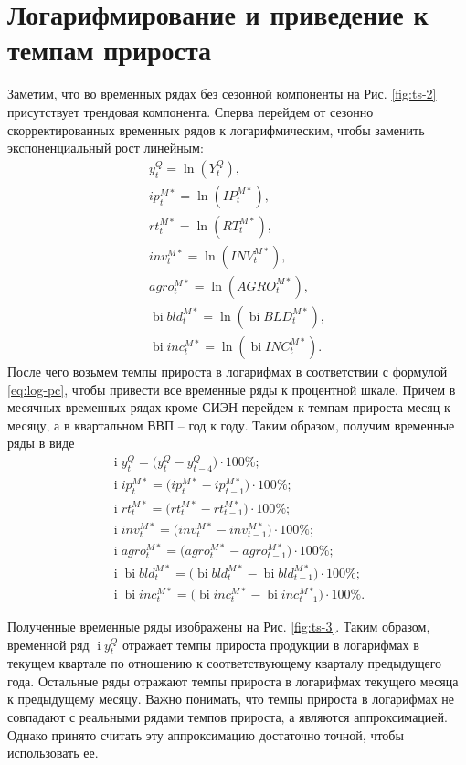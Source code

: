 \documentclass[a4paper, 14pt]{extreport}
\numberwithin{equation}{section}
\renewcommand{\i}{\operatorname{i}}
\newcommand{\bi}{\operatorname{bi}}
\numberwithin{equation}{section}
\begin{document}
	\section{Логарифмирование и приведение к темпам прироста}
	Заметим, что во временных рядах без сезонной компоненты на Рис. \ref{fig:ts-2} присутствует трендовая компонента. Сперва перейдем от сезонно скорректированных временных рядов к логарифмическим, чтобы заменить экспоненциальный рост линейным:
	\begin{equation}
		\label{eq:log-ts}
		\begin{gathered}
			y_t^Q = \ln (Y_t^Q),\\
			ip_t^{M*} = \ln(IP_t^{M*}),\\
			rt_t^{M*} = \ln(RT_t^{M*}),\\
			inv_t^{M*} = \ln(INV_t^{M*}),\\
			agro_t^{M*} = \ln(AGRO_t^{M*}),\\
			\bi bld_t^{M*} = \ln(\bi BLD_t^{M*}),\\
			\bi inc_t^{M*} = \ln(\bi INC_t^{M*}).
		\end{gathered}
	\end{equation}
	 После чего возьмем темпы прироста в логарифмах в соответствии с формулой \eqref{eq:log-pc}, чтобы привести все временные ряды к процентной шкале. Причем в месячных временных рядах кроме СИЭН перейдем к темпам прироста месяц к месяцу, а в квартальном ВВП -- год к году. Таким образом, получим временные ряды в виде
	\begin{equation}
		\label{eq:pc-ts}
		\begin{gathered}
			\i y_t^{Q}=\big(y^Q_t - y^Q_{t-4}\big)\cdot 100\%;\\
			\i ip_t^{M*}=\big(ip_t^{M*} -  ip_{t-1}^{M*}\big)\cdot 100\%;\\
			\i rt_t^{M*}=\big(rt_t^{M*} -  rt_{t-1}^{M*}\big)\cdot 100\%;\\
			\i inv_t^{M*}=\big(inv_t^{M*} -  inv_{t-1}^{M*}\big)\cdot 100\%;\\
			\i agro_t^{M*}=\big(agro_t^{M*} -  agro_{t-1}^{M*}\big)\cdot 100\%;\\
			\i \bi bld_t^{M*}=\big(\bi bld_t^{M*} - \bi bld_{t-1}^{M*}\big)\cdot 100\%;\\
			\i \bi inc_t^{M*}=\big(\bi inc_t^{M*} -  \bi inc_{t-1}^{M*}\big)\cdot 100\%.
		\end{gathered}
	\end{equation}
	
	Полученные временные ряды изображены на Рис. \ref{fig:ts-3}. Таким образом, временной ряд $\i y_t^Q$ отражает темпы прироста продукции в логарифмах в текущем квартале по отношению к соответствующему кварталу предыдущего года. Остальные ряды отражают темпы прироста в логарифмах текущего месяца к предыдущему месяцу. Важно понимать, что темпы прироста в логарифмах не совпадают с реальными рядами темпов прироста, а являются аппроксимацией. Однако принято считать эту аппроксимацию достаточно точной, чтобы использовать ее.
	
\end{document}
